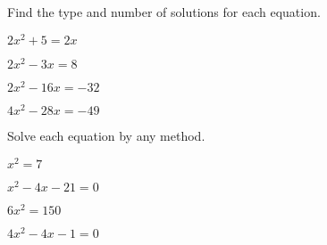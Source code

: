 \documentclass{report}
\theoremstyle{definition}
\begin{document}
\noindent Find the type and number of solutions for each equation.

\begin{enumerate}
\setcounter{enumi}{10}

\begin{minipage}[t]{0.45\linewidth}
\item  $2x^2+5=2x$
\end{minipage}
\hfill
\begin{minipage}[t]{0.45\linewidth}
\item  $2x^2-3x=8$
\end{minipage}

\vspace{1cm}

\begin{minipage}[t]{0.45\linewidth}
\item $2x^2-16x=-32$
\end{minipage}
\hfill
\begin{minipage}[t]{0.45\linewidth}
\item $4x^2-28x=-49$
\end{minipage}

\vspace{1cm}

\end{enumerate}

\noindent Solve each equation by any method.

\begin{enumerate}
\setcounter{enumi}{14}

\begin{minipage}[t]{0.45\linewidth}
\item  $x^2=7$
\end{minipage}
\hfill
\begin{minipage}[t]{0.45\linewidth}
\item  $x^2-4x-21=0$
\end{minipage}

\vspace{1cm}

\begin{minipage}[t]{0.45\linewidth}
\item $6x^2=150$
\end{minipage}
\hfill
\begin{minipage}[t]{0.45\linewidth}
\item $4x^2-4x-1=0$
\end{minipage}

\vspace{1cm}

\end{enumerate}
\end{document}
